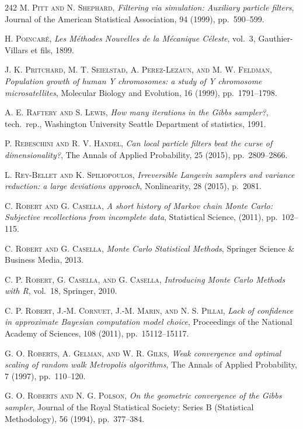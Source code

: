 \begin{thebibliography}{242}
\textsc{M. Pitt and N. Shephard},
\textit{Filtering via simulation: Auxiliary particle filters},
Journal of the American Statistical Association, 94 (1999), pp.\ 590--599.

\textsc{H. Poincar\'e},
\textit{Les M\'ethodes Nouvelles de la M\'ecanique C\'eleste},
vol.\ 3, Gauthier-Villars et fils, 1899.

\textsc{J. K. Pritchard, M. T. Seielstad, A. Perez-Lezaun, and M. W. Feldman},
\textit{Population growth of human Y chromosomes: a study of Y chromosome microsatellites},
Molecular Biology and Evolution, 16 (1999), pp.\ 1791--1798.

\textsc{A. E. Raftery and S. Lewis},
\textit{How many iterations in the Gibbs sampler?},
tech.\ rep., Washington University Seattle Department of statistics, 1991.

\textsc{P. Rebeschini and R. V. Handel},
\textit{Can local particle filters beat the curse of dimensionality?},
The Annals of Applied Probability, 25 (2015), pp.\ 2809--2866.

\textsc{L. Rey-Bellet and K. Spiliopoulos},
\textit{Irreversible Langevin samplers and variance reduction: a large deviations approach},
Nonlinearity, 28 (2015), p.\ 2081.

\textsc{C. Robert and G. Casella},
\textit{A short history of Markov chain Monte Carlo: Subjective recollections from incomplete data},
Statistical Science, (2011), pp.\ 102--115.

\textsc{C. Robert and G. Casella},
\textit{Monte Carlo Statistical Methods},
Springer Science \& Business Media, 2013.

\textsc{C. P. Robert, G. Casella, and G. Casella},
\textit{Introducing Monte Carlo Methods with R},
vol.\ 18, Springer, 2010.

\textsc{C. P. Robert, J.-M. Cornuet, J.-M. Marin, and N. S. Pillai},
\textit{Lack of confidence in approximate Bayesian computation model choice},
Proceedings of the National Academy of Sciences, 108 (2011), pp.\ 15112--15117.

\textsc{G. O. Roberts, A. Gelman, and W. R. Gilks},
\textit{Weak convergence and optimal scaling of random walk Metropolis algorithms},
The Annals of Applied Probability, 7 (1997), pp.\ 110--120.

\textsc{G. O. Roberts and N. G. Polson},
\textit{On the geometric convergence of the Gibbs sampler},
Journal of the Royal Statistical Society: Series B (Statistical Methodology), 56 (1994), pp.\ 377--384.


\end{thebibliography}
